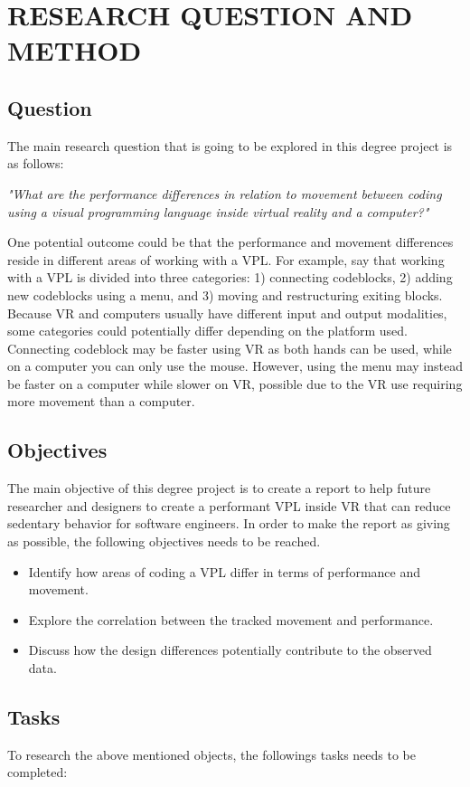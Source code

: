 \documentclass{sigchi}
\begin{document}
\section{RESEARCH QUESTION AND METHOD}

\subsection{Question}
The main research question that is going to be explored in this degree project is as follows:

\textit{
  "What are the performance differences in relation to movement between coding using a visual programming language inside virtual reality and a computer?"
}

One potential outcome could be that the performance and movement differences reside in different areas of working with a VPL. For example, say that working with a VPL is divided into three categories: 1) connecting codeblocks, 2) adding new codeblocks using a menu, and 3) moving and restructuring exiting blocks. Because VR and computers usually have different input and output modalities, some categories could potentially differ depending on the platform used. Connecting codeblock may be faster using VR as both hands can be used, while on a computer you can only use the mouse. However, using the menu may instead be faster on a computer while slower on VR, possible due to the VR use requiring more movement than a computer.

\subsection{Objectives}
The main objective of this degree project is to create a report to help future researcher and designers to create a performant VPL inside VR that can reduce sedentary behavior for software engineers. In order to make the report as giving as possible, the following objectives needs to be reached.
\begin{itemize}
  \item Identify how areas of coding a VPL differ in terms of performance and movement.
  \item Explore the correlation between the tracked movement and performance.
  \item Discuss how the design differences potentially contribute to the observed data.
\end{itemize}

\subsection{Tasks}
To research the above mentioned objects, the followings tasks needs to be completed:
\end{document}
